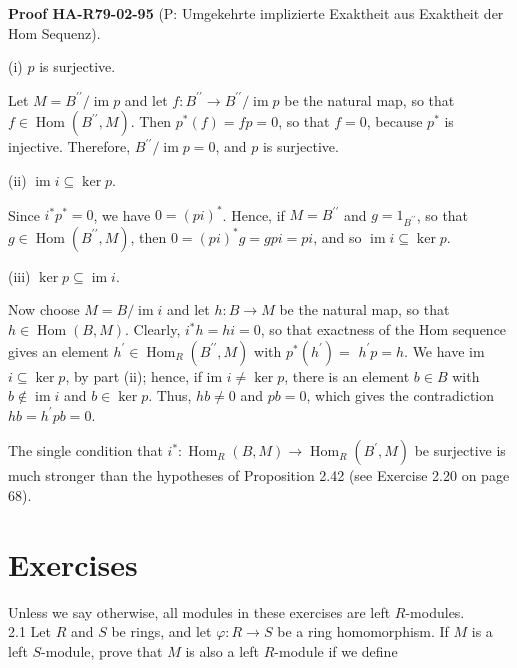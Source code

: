 \documentclass[10pt, letterpaper]{article}
\newcommand{\CustomHeading}[3]{%
  \par\medskip\noindent%
  \textbf{#1 #2} \textnormal{(#3)}.\enskip%
}
\newenvironment{PROOF}[2]{\begin{unitbox}\CustomHeading{Proof}{#1}{#2}}{\end{unitbox}}
\begin{document}
\begin{PROOF}{HA-R79-02-95}{P: Umgekehrte implizierte Exaktheit aus Exaktheit der Hom Sequenz}
(i) $p$ is surjective.

Let $M=B^{\prime \prime} / \operatorname{im} p$ and let $f: B^{\prime \prime} \rightarrow B^{\prime \prime} / \operatorname{im} p$ be the natural map, so that $f \in \operatorname{Hom}\left(B^{\prime \prime}, M\right)$. Then $p^{*}(f)=f p=0$, so that $f=0$, because $p^{*}$ is injective. Therefore, $B^{\prime \prime} / \operatorname{im} p=0$, and $p$ is surjective.

(ii) $\operatorname{im} i \subseteq \operatorname{ker} p$.

Since $i^{*} p^{*}=0$, we have $0=(p i)^{*}$. Hence, if $M=B^{\prime \prime}$ and $g=1_{B^{\prime \prime}}$, so that $g \in \operatorname{Hom}\left(B^{\prime \prime}, M\right)$, then $0=(p i)^{*} g=g p i=p i$, and so $\operatorname{im} i \subseteq \operatorname{ker} p$.

(iii) $\operatorname{ker} p \subseteq \operatorname{im} i$.

Now choose $M=B / \operatorname{im} i$ and let $h: B \rightarrow M$ be the natural map, so that $h \in \operatorname{Hom}(B, M)$. Clearly, $i^{*} h=h i=0$, so that exactness of the Hom sequence gives an element $h^{\prime} \in \operatorname{Hom}_{R}\left(B^{\prime \prime}, M\right)$ with $p^{*}\left(h^{\prime}\right)=$ $h^{\prime} p=h$. We have im $i \subseteq \operatorname{ker} p$, by part (ii); hence, if im $i \neq \operatorname{ker} p$, there is an element $b \in B$ with $b \notin \operatorname{im} i$ and $b \in \operatorname{ker} p$. Thus, $h b \neq 0$ and $p b=0$, which gives the contradiction $h b=h^{\prime} p b=0$.

The single condition that $i^{*}: \operatorname{Hom}_{R}(B, M) \rightarrow \operatorname{Hom}_{R}\left(B^{\prime}, M\right)$ be surjective is much stronger than the hypotheses of Proposition 2.42 (see Exercise 2.20 on page 68).
\end{PROOF}








\pagebreak




\section*{Exercises}
Unless we say otherwise, all modules in these exercises are left $R$-modules.\\
2.1 Let $R$ and $S$ be rings, and let $\varphi: R \rightarrow S$ be a ring homomorphism. If $M$ is a left $S$-module, prove that $M$ is also a left $R$-module if we define
\end{document}
